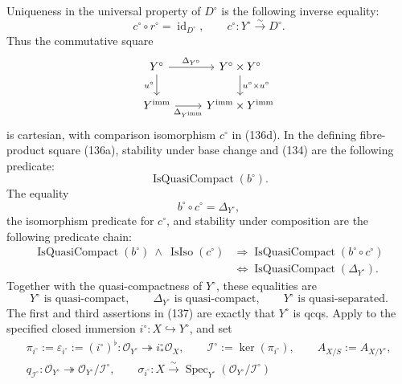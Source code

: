 \begin{definition}
\[  \]
  Uniqueness in the universal property of $D^\circ$ is the following inverse
  equality:
  \[
    c^\circ\circ r^\circ=\operatorname{id}_{D^\circ},
    \qquad
    c^\circ\colon Y^\circ\xrightarrow{\sim}D^\circ.              \tag{136d}
  \]
  Thus the commutative square
  \[
  \begin{tikzcd}
    Y^\circ \arrow[r,"\Delta_{Y^\circ}"] \arrow[d,"u^\circ"'] &
      Y^\circ\times Y^\circ
        \arrow[d,"u^\circ\times u^\circ"]\\
    Y^{\mathrm{imm}} \arrow[r,"\Delta_{Y^{\mathrm{imm}}}"'] &
      Y^{\mathrm{imm}}\times Y^{\mathrm{imm}}
  \end{tikzcd}
  \]
  is cartesian, with comparison isomorphism $c^\circ$ in (136d).  In the
  defining fibre-product square (136a), stability under base change and
  (134) are the following predicate:
  \[
    \operatorname{IsQuasiCompact}(b^\circ).
  \]
  The equality
  \[
    b^\circ\circ c^\circ=\Delta_{Y^\circ},
  \]
  the isomorphism predicate for $c^\circ$, and stability under composition
  are the following predicate chain:
  \[
  \begin{aligned}
    \operatorname{IsQuasiCompact}(b^\circ)\ \wedge\
      \operatorname{IsIso}(c^\circ)
      &\Longrightarrow
        \operatorname{IsQuasiCompact}(b^\circ\circ c^\circ)\\
      &\Longleftrightarrow
        \operatorname{IsQuasiCompact}(\Delta_{Y^\circ}).
  \end{aligned}
  \]
  Together with the quasi-compactness of $Y^\circ$, these equalities are
  \[
    Y^\circ\text{ is quasi-compact},
    \qquad
    \Delta_{Y^\circ}\text{ is quasi-compact},
    \qquad
    Y^\circ\text{ is quasi-separated}.                          \tag{137}
  \]
  The first and third assertions in (137) are exactly that $Y^\circ$ is
  qcqs.  Apply
   to the specified closed
  immersion $i^\circ\colon X\hookrightarrow Y^\circ$, and set
  \[
  \begin{gathered}
    \pi_{i^\circ}:=\varepsilon_{i^\circ}:=(i^\circ)^\flat\colon
      \mathcal O_{Y^\circ}\twoheadrightarrow i^\circ_*\mathcal O_X,
    \qquad
    \mathcal I^\circ:=\ker(\pi_{i^\circ}),
    \qquad
    A_{X/S}:=A_{X/Y^\circ},\\
    q_{\mathcal I^\circ}\colon\mathcal O_{Y^\circ}
      \twoheadrightarrow\mathcal O_{Y^\circ}/\mathcal I^\circ,
    \qquad
    \sigma_{i^\circ}\colon X\xrightarrow{\sim}
      \operatorname{Spec}_{Y^\circ}
        (\mathcal O_{Y^\circ}/\mathcal I^\circ)
  \end{gathered}                                                  \tag{138a}
\]
\end{definition}

